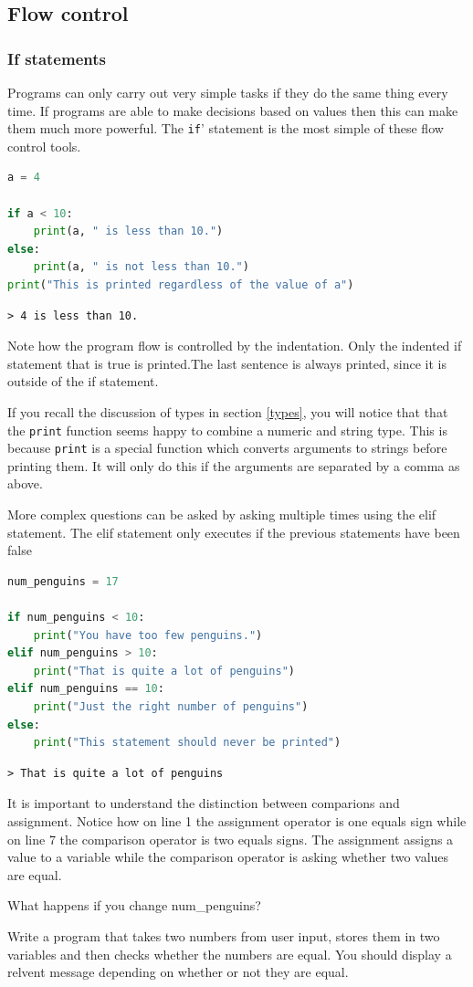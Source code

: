 	\subsection{Flow control}
		\subsubsection{If statements}
		Programs can only carry out very simple tasks if they do the same thing every time. If programs are able to make decisions based on values then this can make them much more powerful. The \texttt{if}' statement is the most simple of these flow control tools.
		
		\begin{lstlisting}[language=Python]
a = 4

if a < 10:
	print(a, " is less than 10.")
else:
	print(a, " is not less than 10.")
print("This is printed regardless of the value of a")\end{lstlisting}
		\begin{verbatim}> 4 is less than 10.\end{verbatim}	
		Note how the program flow is controlled by the indentation. Only the indented if statement that is true is printed.The last sentence is always printed, since it is outside of the if statement.
		
		If you recall the discussion of types in section \ref{types}, you will notice that that the \texttt{print} function seems happy to combine a numeric and string type. This is because \texttt{print} is a special function which converts arguments to strings before printing them. It will only do this if the arguments are separated by a comma as above.
		
		More complex questions can be asked by asking multiple times using the elif statement. The elif statement only executes if the previous statements have been false
		\begin{lstlisting}[language=Python]
num_penguins = 17

if num_penguins < 10:
	print("You have too few penguins.")
elif num_penguins > 10:
	print("That is quite a lot of penguins")
elif num_penguins == 10:
	print("Just the right number of penguins")
else:
	print("This statement should never be printed")\end{lstlisting}
		\begin{verbatim}> That is quite a lot of penguins\end{verbatim}
		It is important to understand the distinction between comparions and assignment. Notice how on line 1 the assignment operator is one equals sign while on line 7 the comparison operator is two equals signs. The assignment assigns a value to a variable while the comparison operator is asking whether two values are equal.
		\begin{task}What happens if you change num\_penguins?\end{task}
		\begin{task}Write a program that takes two numbers from user input, stores them in two variables and then checks whether the numbers are equal. You should display a relvent message depending on whether or not they are equal.\end{task}


